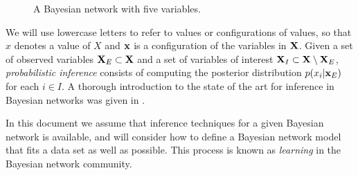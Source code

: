 \begin{figure}[htb]
  \begin{center}
   \scalebox{1}{
    \begin{tikzpicture}

    \simpleModel
    \end{tikzpicture}
    }
  \end{center}
  \caption{A Bayesian network with five variables.}
  \label{fig:sampleBN}
\end{figure}


We will use lowercase letters to refer to
values or configurations of values, so that $x$ denotes a value of $X$ and $\bx$ is a configuration of the
variables in $\bX$. 
Given a set of observed variables $\bX_E\subset \bX$ and a set of variables of interest $\bX_I\subset \bX \setminus \bX_E$,
\emph{probabilistic inference} consists of computing the posterior distribution
$
p(x_i|\bx_E)
$
for each $i\in I$. A thorough introduction to the state of the art for inference in Bayesian networks was given in \cite{D3.1}. 

In this document we assume that inference techniques for a given Bayesian network is available, and will consider how to define a Bayesian network model that fits a data set as well as possible.
This process is known as \textit{learning} in the Bayesian network community.



